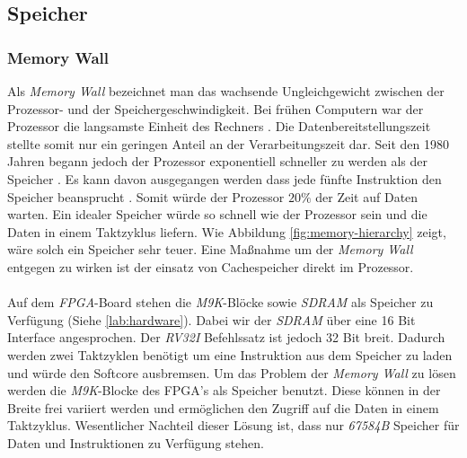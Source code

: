         \subsection{Speicher}
                
            \subsubsection{Memory Wall}
                Als \textit{Memory Wall} bezeichnet man das wachsende Ungleichgewicht zwischen der Prozessor- und der Speichergeschwindigkeit.
                Bei frühen Computern war der Prozessor die langsamste Einheit des Rechners \cite{memory-wall}.
                Die Datenbereitstellungszeit stellte somit nur ein geringen Anteil an der Verarbeitungszeit dar.
                Seit den 1980 Jahren begann jedoch der Prozessor exponentiell schneller zu werden als der Speicher \cite{memory-cpu-gap}.
                Es kann davon ausgegangen werden dass jede fünfte Instruktion den Speicher beansprucht \cite{memory-wall}.
                Somit würde der Prozessor $20\%$ der Zeit auf Daten warten. Ein idealer Speicher würde so schnell wie der Prozessor sein
                und die Daten in einem Taktzyklus liefern.
                Wie Abbildung \ref{fig:memory-hierarchy} zeigt, wäre solch ein Speicher sehr teuer.
                Eine Maßnahme um der \textit{Memory Wall} entgegen zu wirken ist der einsatz von Cachespeicher direkt im Prozessor.
                \\\\
                Auf dem \textit{FPGA}-Board stehen die \textit{M9K}-Blöcke sowie \textit{SDRAM} als Speicher zu Verfügung (Siehe \ref{lab:hardware}).
                Dabei wir der \textit{SDRAM} über eine 16 Bit Interface angesprochen. Der \textit{RV32I} Befehlssatz ist jedoch 32 Bit breit.
                Dadurch werden zwei Taktzyklen benötigt um eine Instruktion aus dem Speicher zu laden und würde den Softcore ausbremsen.
                Um das Problem der \textit{Memory Wall} zu lösen werden die \textit{M9K}-Blocke des FPGA's als Speicher benutzt.
                Diese können in der Breite frei variiert werden und ermöglichen den Zugriff auf die Daten in einem Taktzyklus.
                Wesentlicher Nachteil dieser Lösung ist, dass nur \textit{67584B} Speicher für Daten und Instruktionen zu Verfügung stehen.
                
